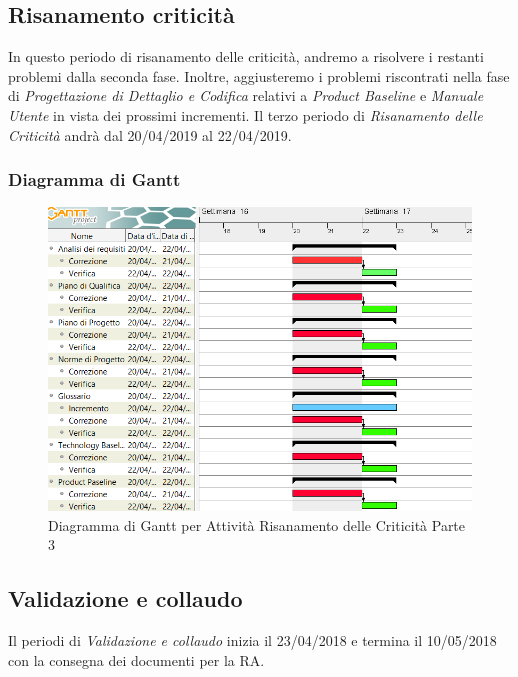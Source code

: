 \subsection{Risanamento criticità}
In questo periodo di risanamento delle criticità, andremo a risolvere i restanti problemi dalla seconda fase. Inoltre, aggiusteremo i problemi riscontrati nella fase di \textit{Progettazione di Dettaglio e Codifica} relativi a \textit{Product Baseline} e \textit{Manuale Utente} in vista dei prossimi incrementi.
Il terzo periodo di \textit{Risanamento delle Criticità} andrà dal 20/04/2019 al 22/04/2019.

\subsubsection{Diagramma di Gantt}
\begin{figure}[h]
	\centering
  		\includegraphics[width=1.0\linewidth]{./images/RisanamentoCriticita3.png}
  		\caption{Diagramma di Gantt per Attività Risanamento delle Criticità Parte 3}
  		\label{fig:Gantt Risananmento Criticità 3}
\end{figure}

\newpage
\subsection{Validazione e collaudo}
Il periodi di \textit{Validazione e collaudo} inizia il 23/04/2018 e termina il 10/05/2018 con la consegna dei documenti per la RA. 

